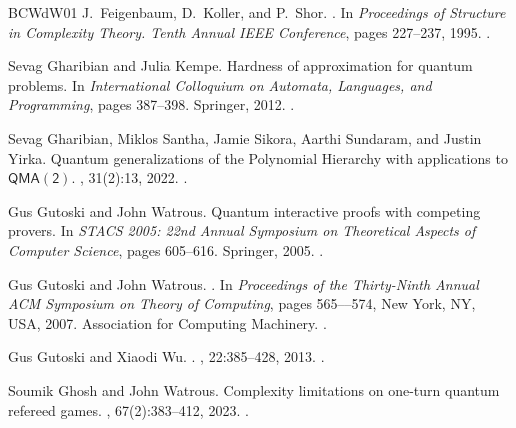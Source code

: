 \documentclass[10pt,a4paper]{article}
\theoremstyle{definition}
\begin{document}
\begin{thebibliography}{BCWdW01}
J.~Feigenbaum, D.~Koller, and P.~Shor.
.
\newblock In {\em Proceedings of Structure in Complexity Theory. Tenth Annual
  IEEE Conference}, pages 227--237, 1995.
\newblock \href {https://doi.org/10.1109/SCT.1995.514861}
  {}.

Sevag Gharibian and Julia Kempe.
\newblock Hardness of approximation for quantum problems.
\newblock In {\em International Colloquium on Automata, Languages, and
  Programming}, pages 387--398. Springer, 2012.
\newblock \href {https://doi.org/10.1007/978-3-642-31594-7_33}
  {}.

Sevag Gharibian, Miklos Santha, Jamie Sikora, Aarthi Sundaram, and Justin
  Yirka.
\newblock Quantum generalizations of the {P}olynomial {H}ierarchy with
  applications to {$\mathsf{QMA(2)}$}.
, 31(2):13, 2022.
\newblock \href {https://doi.org/10.1007/s00037-022-00231-8}
  {}.

Gus Gutoski and John Watrous.
\newblock Quantum interactive proofs with competing provers.
\newblock In {\em STACS 2005: 22nd Annual Symposium on Theoretical Aspects of
  Computer Science}, pages 605--616. Springer, 2005.
\newblock \href {https://doi.org/10.1007/978-3-540-31856-9_50}
  {}.

Gus Gutoski and John Watrous.
.
\newblock In {\em Proceedings of the Thirty-Ninth Annual ACM Symposium on
  Theory of Computing}, pages 565–--574, New York, NY, USA, 2007. Association
  for Computing Machinery.
\newblock \href {https://doi.org/10.1145/1250790.1250873}
  {}.

Gus Gutoski and Xiaodi Wu.
.
, 22:385--428, 2013.
\newblock \href {https://doi.org/10.1007/s00037-013-0065-9}
  {}.

Soumik Ghosh and John Watrous.
\newblock Complexity limitations on one-turn quantum refereed games.
, 67(2):383--412, 2023.
\newblock \href {https://doi.org/10.1007/s00224-022-10105-9}
  {}.


\end{thebibliography}
\end{document}
